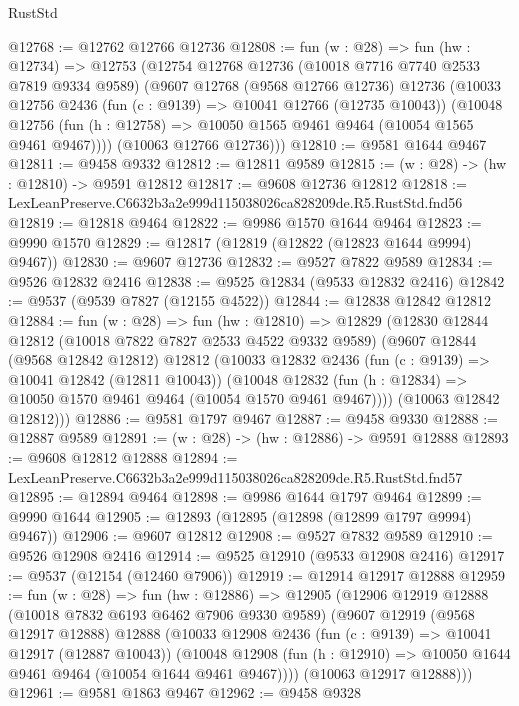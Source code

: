 \begin{lexlean}{RustStd}
\begin{coremodule}
@12768 := @12762 @12766 @12736
@12808 := fun (w : @28) =>
  fun (hw : @12734) =>
  @12753
    (@12754
      @12768
      @12736
      (@10018 @7716 @7740 @2533 @7819 @9334 @9589)
      (@9607
        @12768
        (@9568 @12766 @12736)
        @12736
        (@10033
          @12756
          @2436
          (fun (c : @9139) => @10041 @12766 (@12735 @10043))
          (@10048 @12756 (fun (h : @12758) => @10050 @1565 @9461 @9464 (@10054 @1565 @9461 @9467))))
        (@10063 @12766 @12736)))
@12810 := @9581 @1644 @9467
@12811 := @9458 @9332
@12812 := @12811 @9589
@12815 := (w : @28) -> (hw : @12810) -> @9591 @12812
@12817 := @9608 @12736 @12812
@12818 := LexLeanPreserve.C6632b3a2e999d115038026ca828209de.R5.RustStd.fnd56
@12819 := @12818 @9464
@12822 := @9986 @1570 @1644 @9464
@12823 := @9990 @1570
@12829 := @12817 (@12819 (@12822 (@12823 @1644 @9994) @9467))
@12830 := @9607 @12736
@12832 := @9527 @7822 @9589
@12834 := @9526 @12832 @2416
@12838 := @9525 @12834 (@9533 @12832 @2416)
@12842 := @9537 (@9539 @7827 (@12155 @4522))
@12844 := @12838 @12842 @12812
@12884 := fun (w : @28) =>
  fun (hw : @12810) =>
  @12829
    (@12830
      @12844
      @12812
      (@10018 @7822 @7827 @2533 @4522 @9332 @9589)
      (@9607
        @12844
        (@9568 @12842 @12812)
        @12812
        (@10033
          @12832
          @2436
          (fun (c : @9139) => @10041 @12842 (@12811 @10043))
          (@10048 @12832 (fun (h : @12834) => @10050 @1570 @9461 @9464 (@10054 @1570 @9461 @9467))))
        (@10063 @12842 @12812)))
@12886 := @9581 @1797 @9467
@12887 := @9458 @9330
@12888 := @12887 @9589
@12891 := (w : @28) -> (hw : @12886) -> @9591 @12888
@12893 := @9608 @12812 @12888
@12894 := LexLeanPreserve.C6632b3a2e999d115038026ca828209de.R5.RustStd.fnd57
@12895 := @12894 @9464
@12898 := @9986 @1644 @1797 @9464
@12899 := @9990 @1644
@12905 := @12893 (@12895 (@12898 (@12899 @1797 @9994) @9467))
@12906 := @9607 @12812
@12908 := @9527 @7832 @9589
@12910 := @9526 @12908 @2416
@12914 := @9525 @12910 (@9533 @12908 @2416)
@12917 := @9537 (@12154 (@12460 @7906))
@12919 := @12914 @12917 @12888
@12959 := fun (w : @28) =>
  fun (hw : @12886) =>
  @12905
    (@12906
      @12919
      @12888
      (@10018 @7832 @6193 @6462 @7906 @9330 @9589)
      (@9607
        @12919
        (@9568 @12917 @12888)
        @12888
        (@10033
          @12908
          @2436
          (fun (c : @9139) => @10041 @12917 (@12887 @10043))
          (@10048 @12908 (fun (h : @12910) => @10050 @1644 @9461 @9464 (@10054 @1644 @9461 @9467))))
        (@10063 @12917 @12888)))
@12961 := @9581 @1863 @9467
@12962 := @9458 @9328

\end{coremodule}
\end{lexlean}
